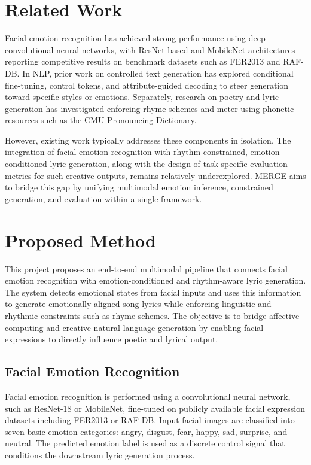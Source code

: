 \documentclass[11pt]{article}
\begin{document}
\section{Related Work}

Facial emotion recognition has achieved strong performance using deep convolutional neural networks, with ResNet-based and MobileNet architectures reporting competitive results on benchmark datasets such as FER2013 and RAF-DB. In NLP, prior work on controlled text generation has explored conditional fine-tuning, control tokens, and attribute-guided decoding to steer generation toward specific styles or emotions. Separately, research on poetry and lyric generation has investigated enforcing rhyme schemes and meter using phonetic resources such as the CMU Pronouncing Dictionary.

However, existing work typically addresses these components in isolation. The integration of facial emotion recognition with rhythm-constrained, emotion-conditioned lyric generation, along with the design of task-specific evaluation metrics for such creative outputs, remains relatively underexplored. MERGE aims to bridge this gap by unifying multimodal emotion inference, constrained generation, and evaluation within a single framework.

\section{Proposed Method}

This project proposes an end-to-end multimodal pipeline that connects facial emotion recognition
with emotion-conditioned and rhythm-aware lyric generation. The system detects emotional states
from facial inputs and uses this information to generate emotionally aligned song lyrics while
enforcing linguistic and rhythmic constraints such as rhyme schemes.
The objective is to bridge affective computing and creative natural language generation by
enabling facial expressions to directly influence poetic and lyrical output.
\subsection{Facial Emotion Recognition}

Facial emotion recognition is performed using a convolutional neural network, such as ResNet-18 or MobileNet, fine-tuned on publicly available facial expression datasets including FER2013 or RAF-DB. Input facial images are classified into seven basic emotion categories: angry, disgust, fear, happy, sad, surprise, and neutral. The predicted emotion label is used as a discrete control signal that conditions the downstream lyric generation process.
\end{document}
